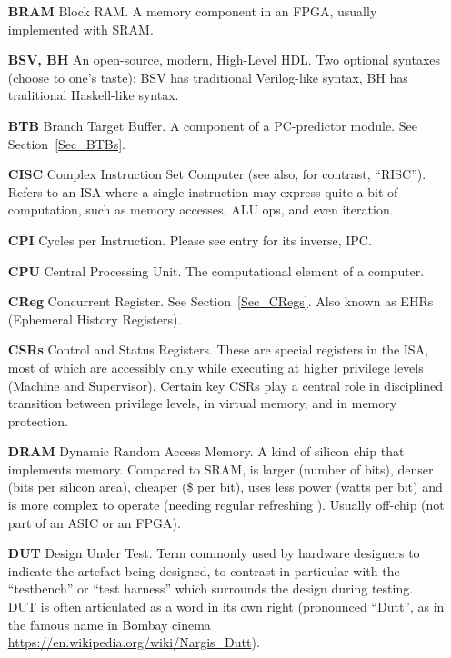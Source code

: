 \begin{itemize}
\item[\bf BRAM] Block RAM.  A memory component in an FPGA, usually
  implemented with SRAM.

\item[\bf BSV, BH] An open-source, modern, High-Level HDL.  Two
  optional syntaxes (choose to one's taste): BSV has traditional
  Verilog-like syntax, BH has traditional Haskell-like syntax.

\item[\bf BTB] Branch Target Buffer.  A component of a PC-predictor
  module.  See Section~\ref{Sec_BTBs}.

\item[\bf CISC] Complex Instruction Set Computer (see also, for
  contrast, ``RISC'').  Refers to an ISA where a single instruction
  may express quite a bit of computation, such as memory accesses, ALU
  ops, and even iteration.

\item[\bf CPI] Cycles per Instruction.  Please see entry for its
  inverse, IPC.

\item[\bf CPU] Central Processing Unit.  The computational element of
  a computer.

\item[\bf CReg] Concurrent Register.  See Section~\ref{Sec_CRegs}.  Also
  known as EHRs (Ephemeral History Registers).

\item[\bf CSRs] Control and Status Registers.  These are special
  registers in the ISA, most of which are accessibly only while
  executing at higher privilege levels (Machine and Supervisor).
  Certain key CSRs play a central role in disciplined transition
  between privilege levels, in virtual memory, and in memory
  protection.

\item[\bf DRAM] Dynamic Random Access Memory.  A kind of silicon chip
  that implements memory.  Compared to SRAM, is larger (number of
  bits), denser (bits per silicon area), cheaper (\$ per bit), uses
  less power (watts per bit) and is more complex to operate (needing
  regular refreshing {\etc}). Usually off-chip (not part of an ASIC or
  an FPGA).

\item[\bf DUT] Design Under Test.  Term commonly used by hardware
  designers to indicate the artefact being designed, to contrast in
  particular with the ``testbench'' or ``test harness'' which
  surrounds the design during testing.  DUT is often articulated as a
  word in its own right (pronounced ``Dutt'', as in the famous name in
  Bombay cinema \url{https://en.wikipedia.org/wiki/Nargis_Dutt}).


\end{itemize}
